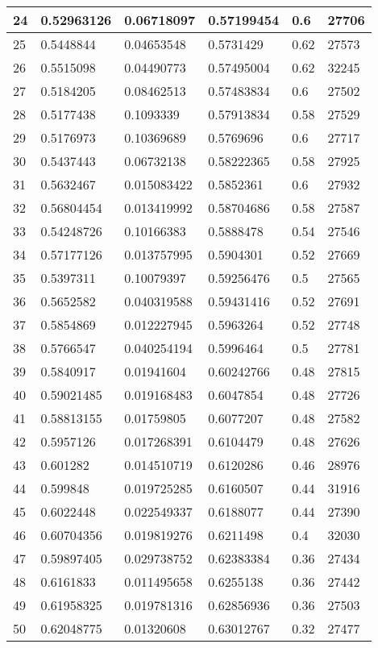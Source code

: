 \begin{longtable}{|l|l|l|l|l|l|}
24 & 0.52963126 & 0.06718097 & 0.57199454 & 0.6 & 27706 \\ \hline 
25 & 0.5448844 & 0.04653548 & 0.5731429 & 0.62 & 27573 \\ \hline 
26 & 0.5515098 & 0.04490773 & 0.57495004 & 0.62 & 32245 \\ \hline 
27 & 0.5184205 & 0.08462513 & 0.57483834 & 0.6 & 27502 \\ \hline 
28 & 0.5177438 & 0.1093339 & 0.57913834 & 0.58 & 27529 \\ \hline 
29 & 0.5176973 & 0.10369689 & 0.5769696 & 0.6 & 27717 \\ \hline 
30 & 0.5437443 & 0.06732138 & 0.58222365 & 0.58 & 27925 \\ \hline 
31 & 0.5632467 & 0.015083422 & 0.5852361 & 0.6 & 27932 \\ \hline 
32 & 0.56804454 & 0.013419992 & 0.58704686 & 0.58 & 27587 \\ \hline 
33 & 0.54248726 & 0.10166383 & 0.5888478 & 0.54 & 27546 \\ \hline 
34 & 0.57177126 & 0.013757995 & 0.5904301 & 0.52 & 27669 \\ \hline 
35 & 0.5397311 & 0.10079397 & 0.59256476 & 0.5 & 27565 \\ \hline 
36 & 0.5652582 & 0.040319588 & 0.59431416 & 0.52 & 27691 \\ \hline 
37 & 0.5854869 & 0.012227945 & 0.5963264 & 0.52 & 27748 \\ \hline 
38 & 0.5766547 & 0.040254194 & 0.5996464 & 0.5 & 27781 \\ \hline 
39 & 0.5840917 & 0.01941604 & 0.60242766 & 0.48 & 27815 \\ \hline 
40 & 0.59021485 & 0.019168483 & 0.6047854 & 0.48 & 27726 \\ \hline 
41 & 0.58813155 & 0.01759805 & 0.6077207 & 0.48 & 27582 \\ \hline 
42 & 0.5957126 & 0.017268391 & 0.6104479 & 0.48 & 27626 \\ \hline 
43 & 0.601282 & 0.014510719 & 0.6120286 & 0.46 & 28976 \\ \hline 
44 & 0.599848 & 0.019725285 & 0.6160507 & 0.44 & 31916 \\ \hline 
45 & 0.6022448 & 0.022549337 & 0.6188077 & 0.44 & 27390 \\ \hline 
46 & 0.60704356 & 0.019819276 & 0.6211498 & 0.4 & 32030 \\ \hline 
47 & 0.59897405 & 0.029738752 & 0.62383384 & 0.36 & 27434 \\ \hline 
48 & 0.6161833 & 0.011495658 & 0.6255138 & 0.36 & 27442 \\ \hline 
49 & 0.61958325 & 0.019781316 & 0.62856936 & 0.36 & 27503 \\ \hline 
50 & 0.62048775 & 0.01320608 & 0.63012767 & 0.32 & 27477 \\ \hline 
\end{longtable}